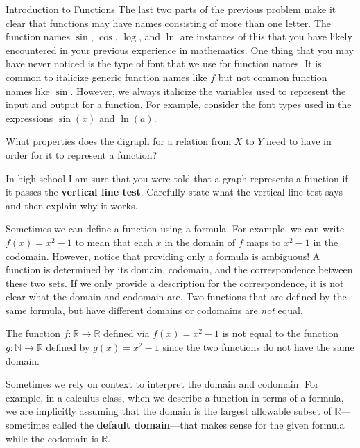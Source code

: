 \begin{section}{Introduction to Functions}
The last two parts of the previous problem make it clear that functions may have names consisting of more than one letter.  The function names $\sin$, $\cos$, $\log$, and $\ln$ are instances of this that you have likely encountered in your previous experience in mathematics. One thing that you may have never noticed is the type of font that we use for function names. It is common to italicize generic function names like $f$ but not common function names like $\sin$.  However, we always italicize the variables used to represent the input and output for a function. For example, consider the font types used in the expressions $\sin(x)$ and $\ln(a)$.

\begin{problem}
What properties does the digraph for a relation from $X$ to $Y$ need to have in order for it to represent a function?
\end{problem}

\begin{problem}
In high school I am sure that you were told that a graph represents a function if it passes the \textbf{vertical line test}.  Carefully state what the vertical line test says and then explain why it works.
\end{problem}

Sometimes we can define a function using a formula. For example, we can write $f(x)=x^2-1$ to mean that each $x$ in the domain of $f$ maps to $x^2-1$ in the codomain. However, notice that providing only a formula is ambiguous!  A function is determined by its domain, codomain, and the correspondence between these two sets. If we only provide a description for the correspondence, it is not clear what the domain and codomain are.  Two functions that are defined by the same formula, but have different domains or codomains are \emph{not} equal.  

\begin{example}
The function $f:\mathbb{R}\to \mathbb{R}$ defined via $f(x)=x^{2}-1$ is not equal to the function $g:\mathbb{N}\to\mathbb{R}$ defined by $g(x)=x^{2}-1$ since the two functions do not have the same domain.
\end{example}

Sometimes we rely on context to interpret the domain and codomain.  For example, in a calculus class, when we describe a function in terms of a formula, we are implicitly assuming that the domain is the largest allowable subset of $\mathbb{R}$---sometimes called the \textbf{default domain}---that makes sense for the given formula while the codomain is $\mathbb{R}$. 


\end{section}
